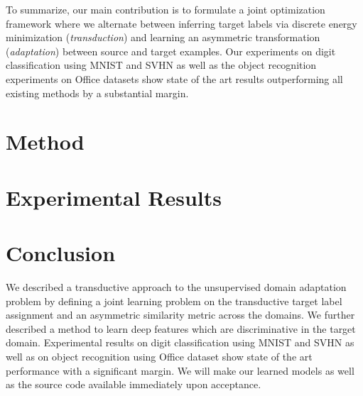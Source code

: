 \documentclass{article}
\begin{document}
To summarize, our main contribution is to formulate a joint optimization framework where we alternate between inferring target labels via discrete energy minimization (\textit{transduction}) and learning an asymmetric transformation (\textit{adaptation}) between source and target examples. Our experiments on digit classification using MNIST \cite{mnist} and SVHN\cite{svhn} as well as the object recognition experiments on Office \cite{office} datasets show state of the art results outperforming all existing methods by a substantial margin.


\section{Method} 




\section{Experimental Results}

\section{Conclusion} 
We described a transductive approach to the unsupervised domain adaptation problem by defining a joint learning problem on the transductive target label assignment and an asymmetric similarity metric across the domains. We further described a method to learn deep features which are discriminative in the target domain. Experimental results on digit classification using MNIST\cite{mnist} and SVHN\cite{svhn} as well as on object recognition using Office\cite{office} dataset show state of the art performance with a significant margin. We will make our learned models as well as the source code available immediately upon acceptance.



\clearpage
\setlength{\bibsep}{2.5pt plus 0.25ex}
{\small


}
\end{document}
